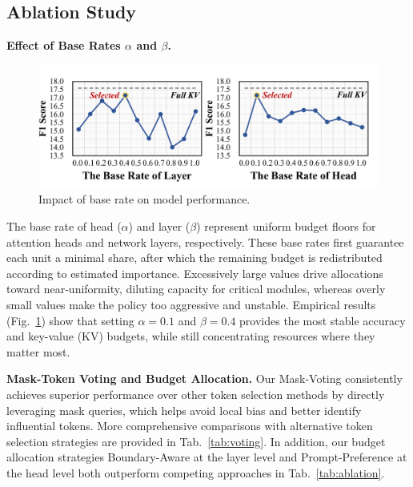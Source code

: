 \subsection{Ablation Study} 
\noindent \textbf{Effect of Base Rates $\alpha$ and $\beta$.}
\begin{figure}[t]
  \centering
  \includegraphics[width=\columnwidth]{figure/hy_new.pdf}
  \caption{Impact of base rate on model performance.}
  \label{fig:hy}
\end{figure}
The base rate of head ($\alpha$) and layer ($\beta$) represent uniform budget floors for attention heads and network layers, respectively.
These base rates first guarantee each unit a minimal share, after which the remaining budget is redistributed according to estimated importance.
Excessively large values drive allocations toward near‑uniformity, diluting capacity for critical modules, whereas overly small values make the policy too aggressive and unstable.
Empirical results (Fig.~\ref{fig:hy}) show that setting $\alpha=0.1$ 
and $\beta=0.4$ provides the most stable accuracy and key-value (KV) budgets, while 
still concentrating resources where they matter most.


\noindent \textbf{Mask-Token Voting and Budget Allocation.}
Our Mask-Voting consistently achieves superior performance over other token selection methods by directly leveraging mask queries, which helps avoid local bias and better identify influential tokens. More comprehensive comparisons with alternative token selection strategies are provided in  Tab.~\ref{tab:voting}. In addition, our budget allocation strategies Boundary-Aware at the layer level and Prompt-Preference at the head level both outperform competing approaches in Tab.~\ref{tab:ablation}.

